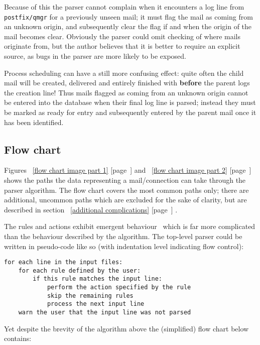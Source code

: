 \documentclass[a4paper,12pt,draft]{article}
\newcommand{\refwithpage}[1]{%
    \empty{}\ref{#1} [page~\pageref{#1}]%
}
\newcommand{\daemon}[1]{%
    \texttt{postfix/#1}%
}
\begin{document}
Because of this the parser cannot complain when it encounters a log line
from \daemon{qmgr} for a previously unseen mail; it must flag the mail as
coming from an unknown origin, and subsequently clear the flag if and when
the origin of the mail becomes clear.  Obviously the parser could omit
checking of where mails originate from, but the author believes that it is
better to require an explicit source, as bugs in the parser are more likely
to be exposed.

Process scheduling can have a still more confusing effect: quite often the
child mail will be created, delivered and entirely finished with
\textbf{before} the parent logs the creation line!  Thus mails flagged as
coming from an unknown origin cannot be entered into the database when
their final log line is parsed; instead they must be marked as ready for
entry and subsequently entered by the parent mail once it has been
identified.

\subsection{Flow chart}

\label{flow-chart}

Figures~\refwithpage{flow chart image part 1} and~\refwithpage{flow chart
image part 2} shows the paths the data representing a mail/connection can
take through the parser algorithm.  The flow chart covers the most common
paths only; there are additional, uncommon paths which are excluded for the
sake of clarity, but are described in section~\refwithpage{additional
complications}.

The rules and actions exhibit emergent behaviour~\cite{Wikipedia-Emergence}
which is far more complicated than the behaviour described by the
algorithm.  The top-level parser could be written in pseudo-code like so
(with indentation level indicating flow control):

\begin{verbatim}
for each line in the input files:
    for each rule defined by the user:
        if this rule matches the input line:
            perform the action specified by the rule
            skip the remaining rules
            process the next input line
    warn the user that the input line was not parsed
\end{verbatim}

Yet despite the brevity of the algorithm above the (simplified) flow chart
below contains:
\end{document}
